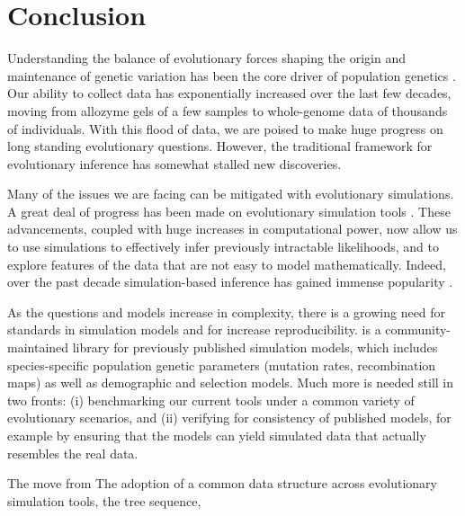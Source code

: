 \chapter{Conclusion}

Understanding the balance of evolutionary forces shaping the origin and maintenance of genetic variation has been the core driver of population genetics \citep{lewontin_genetic_1974}.
Our ability to collect data has exponentially increased over the last few decades, moving from allozyme gels of a few samples to whole-genome data of thousands of individuals.
With this flood of data, we are poised to make huge progress on long standing evolutionary questions.
However, the traditional framework for evolutionary inference has somewhat stalled new discoveries.

Many of the issues we are facing can be mitigated with evolutionary simulations.
A great deal of progress has been made on evolutionary simulation tools \citep{haller_slim_2019,kelleher_efficient_2016, haller_tree-sequence_2019,adrion_community-maintained_2020}.
These advancements, coupled with huge increases in computational power, now allow us to use simulations to effectively infer previously intractable likelihoods,
and to explore features of the data that are not easy to model mathematically.
Indeed, over the past decade simulation-based inference has gained immense popularity \citep{schrider_shic_2016,torres_human_2018,caldas_inference_2022,chan_likelihood-free_2018,korfmann_simultaneous_2023}.

As the questions and models increase in complexity, 
there is a growing need for standards in simulation models and for increase reproducibility.
\stdpopsim is a community-maintained library for previously published simulation models, 
which includes species-specific population genetic parameters (\eg mutation rates, recombination maps) as well as demographic and selection models.
Much more is needed still in two fronts:
(i) benchmarking our current tools under a common variety of evolutionary scenarios, and
(ii) verifying for consistency of published models, for example by ensuring that the models can yield simulated data that actually resembles the real data.

The move from 
The adoption of a common data structure across evolutionary simulation tools, the tree sequence, 


